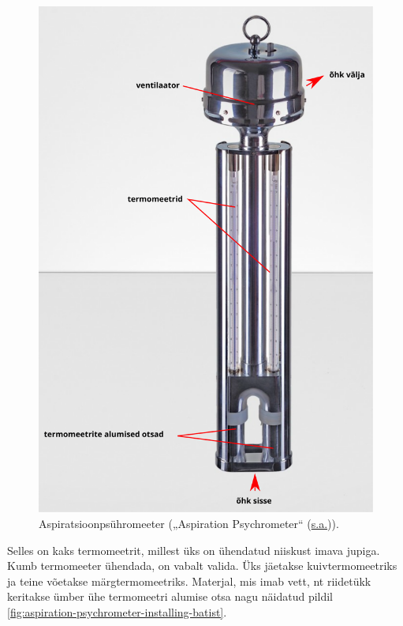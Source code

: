\documentclass[
  12pt,
  a4paper,
  onecolumn, twoside]{article}
\begin{document}
\begin{figure}

{\centering \includegraphics[width=\textwidth,height=0.96\textheight,keepaspectratio=true]{Aspirations-Psychrometer-Fotomontage-65434-LRV1_3000px_2048x2048} 

}

\caption{Aspiratsioonpsühromeeter ({„Aspiration Psychrometer``} (\protect\hyperlink{ref-aspiration}{s.a.})).}\label{fig:aspiration-psychrometer}
\end{figure}

Selles on kaks termomeetrit, millest üks on ühendatud niiskust imava jupiga. Kumb termomeeter ühendada, on vabalt valida. Üks jäetakse kuivtermomeetriks ja teine võetakse märgtermomeetriks. Materjal, mis imab vett, nt riidetükk keritakse ümber ühe termomeetri alumise otsa nagu näidatud pildil \ref{fig:aspiration-psychrometer-installing-batist}.
\end{document}
